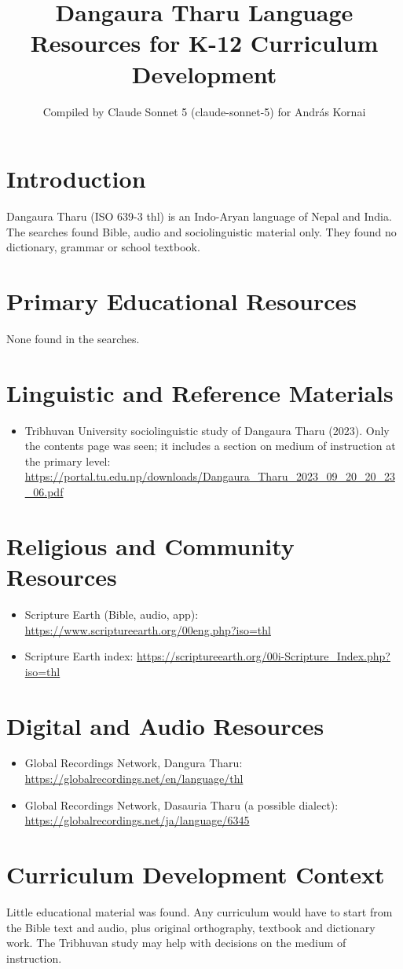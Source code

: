 \documentclass[12pt]{article}
\title{Dangaura Tharu Language Resources for K-12 Curriculum Development}
\author{Compiled by Claude Sonnet 5 (claude-sonnet-5) for Andr\'as Kornai}
\date{}
\begin{document}
\maketitle

\section{Introduction}
Dangaura Tharu (ISO 639-3 thl) is an Indo-Aryan language of Nepal and India. The searches found Bible, audio and sociolinguistic material only. They found no dictionary, grammar or school textbook.

\section{Primary Educational Resources}
None found in the searches.

\section{Linguistic and Reference Materials}
\begin{itemize}
\item Tribhuvan University sociolinguistic study of Dangaura Tharu (2023). Only the contents page was seen; it includes a section on medium of instruction at the primary level: \url{https://portal.tu.edu.np/downloads/Dangaura_Tharu_2023_09_20_20_23_06.pdf}
\end{itemize}

\section{Religious and Community Resources}
\begin{itemize}
\item Scripture Earth (Bible, audio, app): \url{https://www.scriptureearth.org/00eng.php?iso=thl}
\item Scripture Earth index: \url{https://scriptureearth.org/00i-Scripture_Index.php?iso=thl}
\end{itemize}

\section{Digital and Audio Resources}
\begin{itemize}
\item Global Recordings Network, Dangura Tharu: \url{https://globalrecordings.net/en/language/thl}
\item Global Recordings Network, Dasauria Tharu (a possible dialect): \url{https://globalrecordings.net/ja/language/6345}
\end{itemize}

\section{Curriculum Development Context}
Little educational material was found. Any curriculum would have to start from the Bible text and audio, plus original orthography, textbook and dictionary work. The Tribhuvan study may help with decisions on the medium of instruction.
\end{document}
